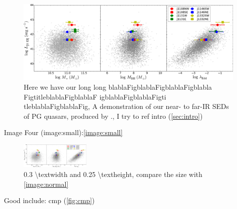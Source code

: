 \begin{figure}[htbp]
\centering
\includegraphics[keepaspectratio,width=\textwidth,height=0.75\textheight]{../_demoResources/figs/zhihu/comp_dr7.pdf}
\caption{Here we have our long long blablaFigblablaFigblablaFigblabla FigtitleblablaFigblablaF igblablaFigblablaFigti tleblablaFigblablaFig, \small A demonstration of our near- to far-IR SEDs of PG quasars, produced by \cite{Kormendy&Richstone1995ARA&A}., I try to ref intro (\autoref{sec:intro})}
\label{image:normal}
\end{figure}

Image Four (image:small):\autoref{image:small}

\begin{figure}[htbp]
\centering
\includegraphics[width=0.30\textwidth,height=0.25\textheight]{../_demoResources/figs/zhihu/comp_dr7.pdf}
\caption{0.3 \textbackslash{}textwidth and 0.25 \textbackslash{}textheight, compare the size with \autoref{image:normal}}
\label{image:small}
\end{figure}

Good include: cmp (\autoref{fig:cmp})


